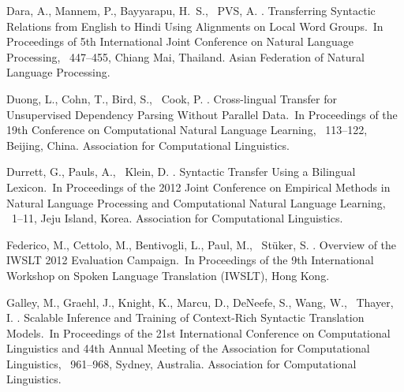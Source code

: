 \documentclass[english]{jnlp_1.4}
\begin{document}
\begin{thebibliography}{}
Dara, A., Mannem, P., Bayyarapu, H.~S., \BBA\ PVS, A. \BBCP.
\newblock \BBOQ Transferring Syntactic Relations from English to Hindi Using
  Alignments on Local Word Groups.\BBCQ\
\newblock In {\Bem Proceedings of 5th International Joint Conference on Natural
  Language Processing}, \mbox{\BPGS\ 447--455}, Chiang Mai, Thailand. Asian
  Federation of Natural Language Processing.

Duong, L., Cohn, T., Bird, S., \BBA\ Cook, P. \BBCP.
\newblock \BBOQ Cross-lingual Transfer for Unsupervised Dependency Parsing
  Without Parallel Data.\BBCQ\
\newblock In {\Bem Proceedings of the 19th Conference on Computational Natural
  Language Learning}, \mbox{\BPGS\ 113--122}, Beijing, China. Association for
  Computational Linguistics.

Durrett, G., Pauls, A., \BBA\ Klein, D. \BBOP 2012\BBCP.
\newblock \BBOQ Syntactic Transfer Using a Bilingual Lexicon.\BBCQ\
\newblock In {\Bem Proceedings of the 2012 Joint Conference on Empirical
  Methods in Natural Language Processing and Computational Natural Language
  Learning}, \mbox{\BPGS\ 1--11}, Jeju Island, Korea. Association for
  Computational Linguistics.

Federico, M., Cettolo, M., Bentivogli, L., Paul, M., \BBA\ St{\"{u}}ker, S.
  \BBCP.
\newblock \BBOQ Overview of the IWSLT 2012 Evaluation Campaign.\BBCQ\
\newblock In {\Bem Proceedings of the 9th International Workshop on Spoken
  Language Translation (IWSLT)}, Hong Kong.

Galley, M., Graehl, J., Knight, K., Marcu, D., DeNeefe, S., Wang, W., \BBA\
  Thayer, I. \BBCP.
\newblock \BBOQ Scalable Inference and Training of Context-Rich Syntactic
  Translation Models.\BBCQ\
\newblock In {\Bem Proceedings of the 21st International Conference on
  Computational Linguistics and 44th Annual Meeting of the Association for
  Computational Linguistics}, \mbox{\BPGS\ 961--968}, Sydney, Australia.
  Association for Computational Linguistics.


\end{thebibliography}
\end{document}
